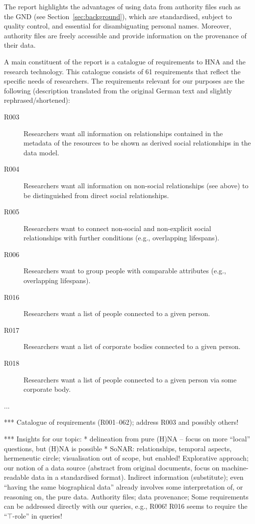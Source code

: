 The report highlights the advantages of using data from authority files
such as the GND (see Section~\ref{sec:background}), which are standardised,
subject to quality control, and essential for disambiguating personal names.
Moreover, authority files are freely accessible and provide information
on the provenance of their data.

A main constituent of the report is a catalogue of requirements
to HNA and the research technology. This catalogue consists of 61
requirements that reflect the specific needs of researchers.
The requirements relevant for our purposes are the following
(description translated from the original German text and slightly rephrased/shortened):
%
\begin{description}
  \item[R003]
    Researchers want all information on relationships contained in the metadata of the resources
    to be shown as derived social relationships in the data model.
  \item[R004]
    Researchers want all information on non-social
    relationships (see above) to be distinguished from direct social relationships.
  \item[R005]
    Researchers want to connect non-social and non-explicit social relationships
    with further conditions (e.g., overlapping lifespans).
  \item[R006]
    Researchers want to group people with comparable attributes (e.g., overlapping lifespans).
  \item[R016]
    Researchers want a list of people connected to a given person.
  \item[R017]
    Researchers want a list of corporate bodies connected to a given person.
  \item[R018]
    Researchers want a list of people connected to a given person via some corporate body.
  \item[...]
\end{description}



*** Catalogue of requirements (R001--062); address R003 and possibly others!



*** Insights for our topic:
* delineation from pure (H)NA -- focus on more \enquote{local} questions, but (H)NA is possible
* SoNAR: relationships, temporal aspects, hermeneutic circle; visualisation out of scope, but enabled!
  Explorative approach; our notion of a data source (abstract from original documents, focus on machine-readable data in a standardised format).
  Indirect information (substitute); even \enquote{having the same biographical data} already involves some interpretation of, or reasoning on, the pure data.
  Authority files; data provenance;
  Some requirements can be addressed directly with our queries, e.g., R006!
  R016 seems to require the \enquote{$\top$-role} in queries!



